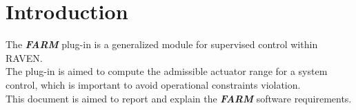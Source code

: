 \section{Introduction}
The \textbf{\textit{FARM}} plug-in is a generalized module for supervised control within RAVEN.
\\The plug-in is aimed to compute the admissible actuator range for a system control, which is 
important to avoid operational constraints violation.
\\This document is aimed to report and explain the  \textbf{\textit{FARM}} software requirements.
